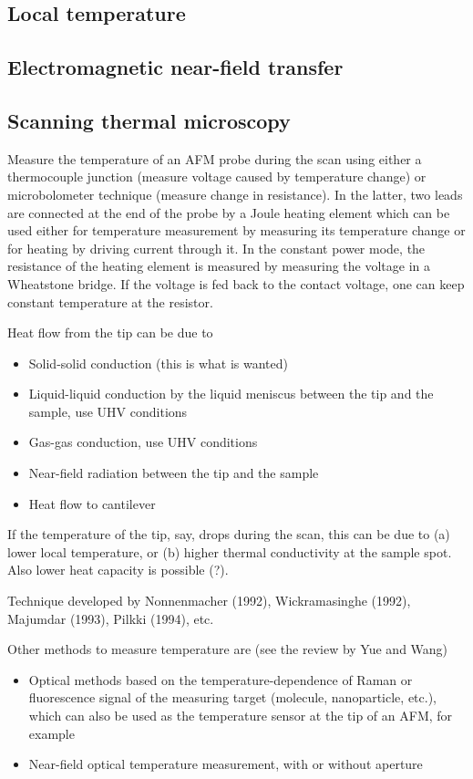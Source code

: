 \subsection{Local temperature}

\subsection{Electromagnetic near-field transfer}

\subsection{Scanning thermal microscopy}

Measure the temperature of an AFM probe during the scan using either a thermocouple junction (measure voltage caused by temperature change) or microbolometer technique (measure change in resistance). In the latter, two leads are connected at the end of the probe by a Joule heating element which can be used either for temperature measurement by measuring its temperature change or for heating by driving current through it. In the constant power mode, the resistance of the heating element is measured by measuring the voltage in a Wheatstone bridge. If the voltage is fed back to the contact voltage, one can keep constant temperature at the resistor. 

Heat flow from the tip can be due to
\begin{itemize}
 \item Solid-solid conduction (this is what is wanted)
 \item Liquid-liquid conduction by the liquid meniscus between the tip and the sample, use UHV conditions
 \item Gas-gas conduction, use UHV conditions
 \item Near-field radiation between the tip and the sample
 \item Heat flow to cantilever
\end{itemize}

If the temperature of the tip, say, drops during the scan, this can be due to (a) lower local temperature, or (b) higher thermal conductivity at the sample spot. Also lower heat capacity is possible (?). 

Technique developed by Nonnenmacher (1992), Wickramasinghe (1992), Majumdar (1993), Pilkki (1994), etc.

Other methods to measure temperature are (see the review by Yue and Wang)
\begin{itemize}
 \item Optical methods based on the temperature-dependence of Raman or fluorescence signal of the measuring target (molecule, nanoparticle, etc.), which can also be used as the temperature sensor at the tip of an AFM, for example
 \item Near-field optical temperature measurement, with or without aperture
\end{itemize}

